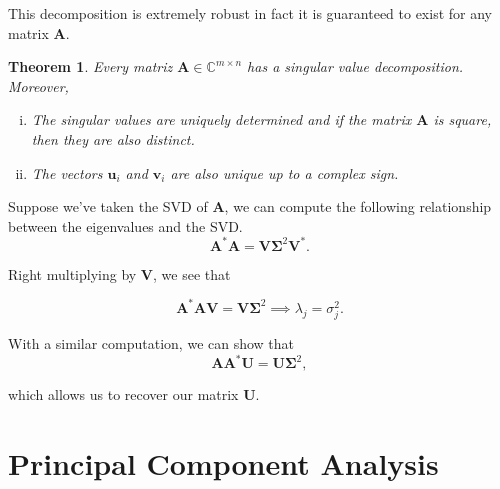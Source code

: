 \documentclass[12pt]{article}
\newcommand{\bbC}{\mathbb{C}}
\renewcommand{\vec}[1]{\mathbf{#1}}
\newtheorem{thm}{Theorem}[section]
\theoremstyle{definition}
\theoremstyle{remark}
\numberwithin{equation}{section}
\begin{document}
This decomposition is extremely robust in fact it is guaranteed to exist for any matrix $\vec{A}$.
\begin{thm}
  Every matriz $\vec{A} \in \bbC^{m\times n}$ has a singular value decomposition. Moreover,
  \begin{enumerate}[(i)]
    \item The singular values are uniquely determined and if the matrix $\vec{A}$ is square, then they are also distinct.
    \item The vectors $\vec{u}_i$ and $\vec{v}_i$ are also unique up to a complex sign.
  \end{enumerate}
\end{thm}

Suppose we've taken the SVD of $\vec{A}$, we can compute the following relationship between the eigenvalues and the SVD.
\begin{equation}
  \vec{A}^*\vec{A} = \vec{V}\vec{\Sigma}^2\vec{V}^*.
\end{equation}

Right multiplying by $\vec{V}$, we see that 

\begin{equation}
  \vec{A}^*\vec{A} \vec{V} = \vec{V}\vec{\Sigma}^2 \implies \lambda_j = \sigma_j^2.
\end{equation}

With a similar computation, we can show that
\begin{equation}
  \vec{A}\vec{A}^* \vec{U} = \vec{U} \vec{\Sigma}^2,
\end{equation}

which allows us to recover our matrix $\vec{U}$.

\section{Principal Component Analysis}%
\label{sec:principal_component_analysis}





\end{document}

